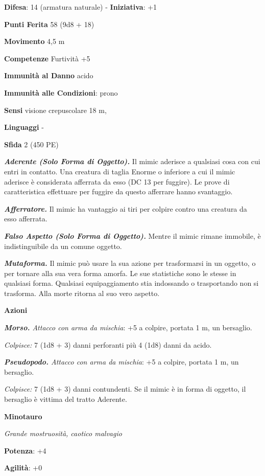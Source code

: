 \begin{multicols}{2}
\textbf{Difesa}: 14 (armatura naturale) - \textbf{Iniziativa}: +1

\textbf{Punti Ferita} 58 (9d8 + 18)

\textbf{Movimento} 4,5 m

\textbf{Competenze} Furtività +5

\textbf{Immunità al Danno} acido

\textbf{Immunità alle Condizioni}: prono

\textbf{Sensi} visione crepuscolare 18 m, 

\textbf{Linguaggi} -

\textbf{Sfida} 2 (450 PE)\smallskip

\emph{\textbf{Aderente (Solo Forma di Oggetto).}} Il mimic aderisce a
qualsiasi cosa con cui entri in contatto. Una creatura di taglia Enorme
o inferiore a cui il mimic aderisce è considerata afferrata da esso (DC
13 per fuggire). Le prove di caratteristica effettuare per fuggire da
questo afferrare hanno svantaggio.

\emph{\textbf{Afferratore.}} Il mimic ha vantaggio ai tiri per colpire
contro una creatura da esso afferrata.

\emph{\textbf{Falso Aspetto (Solo Forma di Oggetto).}} Mentre il mimic
rimane immobile, è indistinguibile da un comune oggetto.

\emph{\textbf{Mutaforma.}} Il mimic può usare la sua azione per
trasformarsi in un oggetto, o per tornare alla sua vera forma amorfa. Le
sue statistiche sono le stesse in qualsiasi forma. Qualsiasi
equipaggiamento stia indossando o trasportando non si trasforma. Alla
morte ritorna al suo vero aspetto.

\smallskip\textbf{Azioni}

\emph{\textbf{Morso.} Attacco con arma da mischia}: +5 a colpire,
portata 1 m, un bersaglio.

\emph{Colpisce:} 7 (1d8 + 3) danni perforanti più 4 (1d8) danni da
acido.

\emph{\textbf{Pseudopodo.} Attacco con arma da mischia}: +5 a colpire,
portata 1 m, un bersaglio.

\emph{Colpisce:} 7 (1d8 + 3) danni contundenti. Se il mimic è in forma
di oggetto, il bersaglio è vittima del tratto Aderente.



\textbf{Minotauro}

\emph{Grande mostruosità, caotico malvagio}

\textbf{Potenza}: +4

\textbf{Agilità}: +0


\end{multicols}
